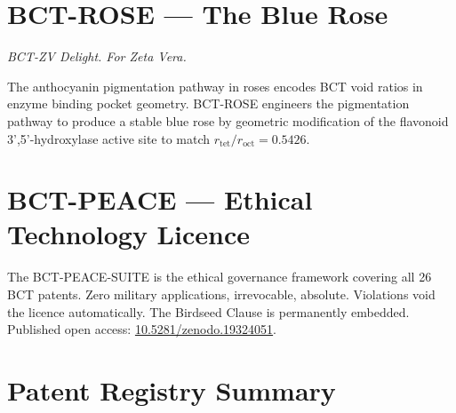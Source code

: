 \documentclass[aps,prl,twocolumn,showpacs,preprintnumbers]{revtex4-2}
\newcommand{\roct}{r_{\mathrm{oct}}}
\newcommand{\rtet}{r_{\mathrm{tet}}}
\begin{document}
\section{BCT-ROSE --- The Blue Rose}
\noindent\textit{BCT-ZV Delight. For Zeta Vera.}

\medskip
The anthocyanin pigmentation pathway in roses encodes BCT void ratios
in enzyme binding pocket geometry. BCT-ROSE engineers the pigmentation
pathway to produce a stable blue rose by geometric modification of
the flavonoid 3',5'-hydroxylase active site to match $\rtet/\roct = 0.5426$.

\section{BCT-PEACE --- Ethical Technology Licence}

The BCT-PEACE-SUITE is the ethical governance framework covering all
26 BCT patents. Zero military applications, irrevocable, absolute.
Violations void the licence automatically. The Birdseed Clause is
permanently embedded. Published open access:
\href{https://doi.org/10.5281/zenodo.19324051}{10.5281/zenodo.19324051}.

\section*{Patent Registry Summary}
\end{document}
